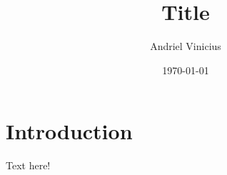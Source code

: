 \documentclass[a4paper,12pt]{article}
\title{Title}
\author{Andriel Vinicius}
\date{\today}
\begin{document}
\maketitle

\section{Introduction}
Text here!
\end{document}
